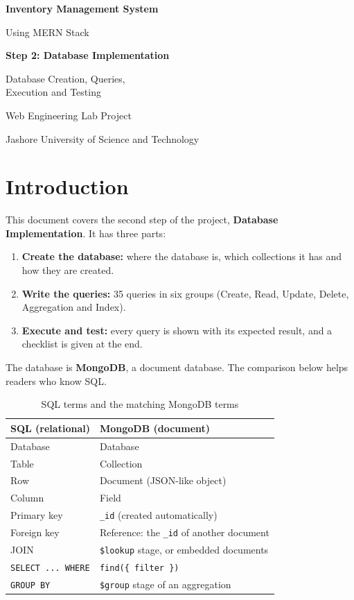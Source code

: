 \documentclass[11pt,a4paper]{article}
\newcommand{\code}[1]{\texttt{#1}}
\begin{document}
\begin{titlepage}
  \centering
  \vspace*{3cm}
  {\LARGE\bfseries Inventory Management System\par}
  \vspace{0.4cm}
  {\Large Using MERN Stack\par}
  \vspace{1.5cm}
  {\Large\bfseries Step 2: Database Implementation\par}
  \vspace{0.4cm}
  {\large Database Creation, Queries,\\ Execution and Testing\par}
  \vfill
  {\large Web Engineering Lab Project\par}
  \vspace{0.3cm}
  {\large Jashore University of Science and Technology\par}
  \vspace{2cm}
\end{titlepage}

\tableofcontents
\newpage

\section{Introduction}
This document covers the second step of the project, \textbf{Database Implementation}. It has three parts:
\begin{enumerate}
  \item \textbf{Create the database:} where the database is, which collections it has and how they are created.
  \item \textbf{Write the queries:} 35 queries in six groups (Create, Read, Update, Delete, Aggregation and Index).
  \item \textbf{Execute and test:} every query is shown with its expected result, and a checklist is given at the end.
\end{enumerate}
The database is \textbf{MongoDB}, a document database. The comparison below helps readers who know SQL.

\begin{table}[h]
\centering
\begin{tabular}{@{}ll@{}}
\toprule
\textbf{SQL (relational)} & \textbf{MongoDB (document)} \\
\midrule
Database & Database \\
Table & Collection \\
Row & Document (JSON-like object) \\
Column & Field \\
Primary key & \code{\_id} (created automatically) \\
Foreign key & Reference: the \code{\_id} of another document \\
JOIN & \code{\$lookup} stage, or embedded documents \\
\code{SELECT ... WHERE} & \code{find(\{ filter \})} \\
\code{GROUP BY} & \code{\$group} stage of an aggregation \\
\bottomrule
\end{tabular}
\caption{SQL terms and the matching MongoDB terms}
\end{table}
\end{document}
